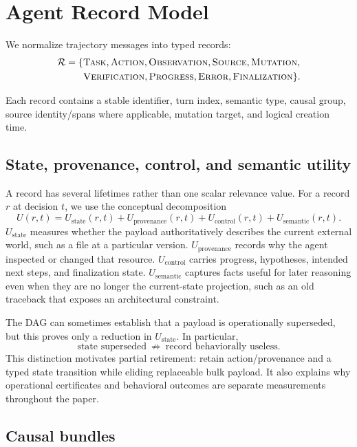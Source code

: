 \documentclass[11pt]{article}
\begin{document}
\section{Agent Record Model}

We normalize trajectory messages into typed records:
\[
\begin{aligned}
\mathcal R = \{&\textsc{Task},\textsc{Action},\textsc{Observation},
\textsc{Source},\textsc{Mutation},\\
&\textsc{Verification},\textsc{Progress},\textsc{Error},
\textsc{Finalization}\}.
\end{aligned}
\]

Each record contains a stable identifier, turn index, semantic type, causal
group, source identity/spans where applicable, mutation target, and logical
creation time.

\subsection{State, provenance, control, and semantic utility}

A record has several lifetimes rather than one scalar relevance value. For a
record $r$ at decision $t$, we use the conceptual decomposition
\[
U(r,t)=U_{\mathrm{state}}(r,t)+U_{\mathrm{provenance}}(r,t)
      +U_{\mathrm{control}}(r,t)+U_{\mathrm{semantic}}(r,t).
\]
$U_{\mathrm{state}}$ measures whether the payload authoritatively describes
the current external world, such as a file at a particular version.
$U_{\mathrm{provenance}}$ records why the agent inspected or changed that
resource. $U_{\mathrm{control}}$ carries progress, hypotheses, intended next
steps, and finalization state. $U_{\mathrm{semantic}}$ captures facts useful
for later reasoning even when they are no longer the current-state projection,
such as an old traceback that exposes an architectural constraint.

The DAG can sometimes establish that a payload is operationally superseded,
but this proves only a reduction in $U_{\mathrm{state}}$. In particular,
\[
\text{state superseded}\ \not\Rightarrow\ \text{record behaviorally useless}.
\]
This distinction motivates partial retirement: retain action/provenance and a
typed state transition while eliding replaceable bulk payload. It also
explains why operational certificates and behavioral outcomes are separate
measurements throughout the paper.

\subsection{Causal bundles}
\end{document}
